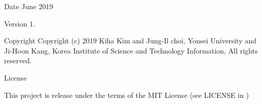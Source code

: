 \begin{DoxyDate}{Date}
June 2019 
\end{DoxyDate}
\begin{DoxyVersion}{Version}
1. 
\end{DoxyVersion}
\begin{DoxyParagraph}{Copyright}
Copyright (c) 2019 Kiha Kim and Jung-\/\+Il choi, Yonsei University and Ji-\/\+Hoon Kang, Korea Institute of Science and Technology Information, All rights reserved. 
\end{DoxyParagraph}
\begin{DoxyParagraph}{License }

\end{DoxyParagraph}
This project is release under the terms of the M\+IT License (see L\+I\+C\+E\+N\+SE in ) 